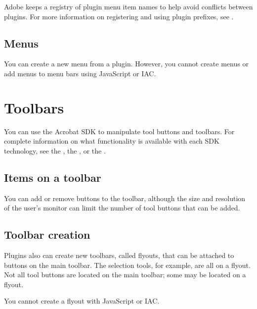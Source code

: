 \documentclass[letterpaper,12pt,english,openany,oneside]{sphinxmanual}
\begin{document}
Adobe keeps a registry of plug\sphinxhyphen{}in menu item names to help avoid conflicts between plug\sphinxhyphen{}ins. For more information on registering and using plug\sphinxhyphen{}in prefixes, see  .


\subsection{Menus}
\label{\detokenize{Overview_UserInterface:menus}}
You can create a new menu from a plug\sphinxhyphen{}in. However, you cannot create menus or add menus to menu bars using JavaScript or IAC.




\section{Toolbars}
\label{\detokenize{Overview_UserInterface:toolbars}}
You can use the Acrobat SDK to manipulate tool buttons and toolbars. For complete information on what functionality is available with each SDK technology, see the  , the  , or the  .


\subsection{Items on a toolbar}
\label{\detokenize{Overview_UserInterface:items-on-a-toolbar}}
You can add or remove buttons to the toolbar, although the size and resolution of the user’s monitor can limit the number of tool buttons that can be added.


\subsection{Toolbar creation}
\label{\detokenize{Overview_UserInterface:toolbar-creation}}
Plug\sphinxhyphen{}ins also can create new toolbars, called flyouts, that can be attached to buttons on the main toolbar. The selection tools, for example, are all on a flyout. Not all tool buttons are located on the main toolbar; some may be located on a flyout.

You cannot create a flyout with JavaScript or IAC.
\end{document}
